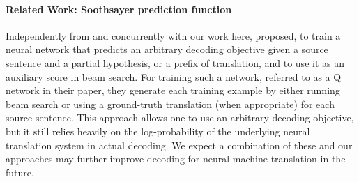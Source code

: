 




\paragraph{Related Work: Soothsayer prediction function}

Independently from and concurrently with our work here, \citet{li2017learning} proposed, to train a neural network that predicts an arbitrary decoding objective given a source sentence and a partial hypothesis, or a prefix of translation, and to use it as an auxiliary score in beam search. For training such a network, referred to as a Q network in their paper, they generate each training example by either running beam search or using a ground-truth translation (when appropriate) for each source sentence. This approach allows one to use an arbitrary decoding objective, but it still relies heavily on the log-probability of the underlying neural translation system in actual decoding. We expect a combination of these and our approaches may further improve decoding for neural machine translation in the future.

